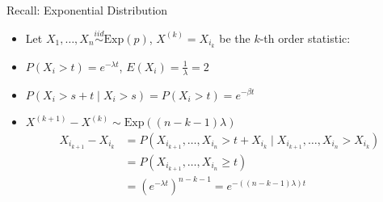 \documentclass[aspectratio=169]{beamer}
\newcommand{\pauseitem}{\onslide<+-> \item}
\newcommand{\ExpD}{\mathrm{Exp}}
\begin{document}
\begin{frame}{Recall: Exponential Distribution}
    \begin{itemize}
        \pauseitem Let $X_1, \ldots, X_n \overset{iid}{\sim} \ExpD(p)$, $X^{(k)} = X_{i_k}$ be the $k$-th order statistic:
        \pauseitem $P(X_i > t) = e^{-\lambda t}$, $E(X_i) = \frac{1}{\lambda} = 2$
        \pauseitem $P(X_i > s + t \mid X_i > s) = P(X_i > t) = e^{- \beta t}$
        \pauseitem $X^{(k+1)} - X^{(k)} \sim \ExpD((n - k - 1) \lambda)$
        \begin{align*}
            X_{i_{k+1}} - X_{i_k} & = P( X_{i_{k+1}}, \ldots, X_{i_n} > t + X_{i_k} \mid X_{i_{k+1}}, \ldots, X_{i_n} > X_{i_k}) \\
                                  & = P(X_{i_{k+1}}, \ldots, X_{i_n} \ge t)                                                      \\
                                  & = (e^{- \lambda t})^{n - k - 1} = e^{- ((n - k - 1) \lambda) t }
        \end{align*}
    \end{itemize}
\end{frame}
\end{document}
